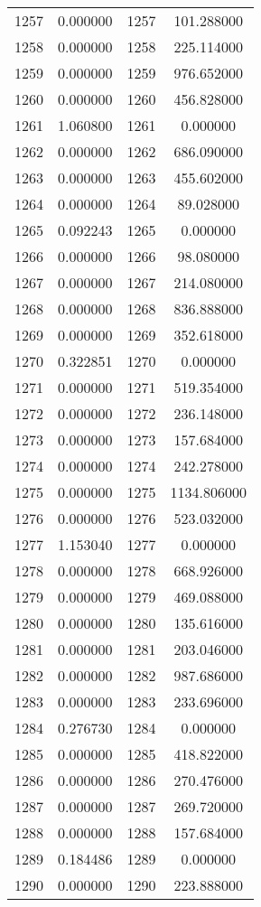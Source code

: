 \documentclass[12pt]{article}
\begin{document}
\begin{longtable}{@{}cccc@{}}
1257 & 0.000000 & 1257 & 101.288000 \\
1258 & 0.000000 & 1258 & 225.114000 \\
1259 & 0.000000 & 1259 & 976.652000 \\
1260 & 0.000000 & 1260 & 456.828000 \\
1261 & 1.060800 & 1261 & 0.000000 \\
1262 & 0.000000 & 1262 & 686.090000 \\
1263 & 0.000000 & 1263 & 455.602000 \\
1264 & 0.000000 & 1264 & 89.028000 \\
1265 & 0.092243 & 1265 & 0.000000 \\
1266 & 0.000000 & 1266 & 98.080000 \\
1267 & 0.000000 & 1267 & 214.080000 \\
1268 & 0.000000 & 1268 & 836.888000 \\
1269 & 0.000000 & 1269 & 352.618000 \\
1270 & 0.322851 & 1270 & 0.000000 \\
1271 & 0.000000 & 1271 & 519.354000 \\
1272 & 0.000000 & 1272 & 236.148000 \\
1273 & 0.000000 & 1273 & 157.684000 \\
1274 & 0.000000 & 1274 & 242.278000 \\
1275 & 0.000000 & 1275 & 1134.806000 \\
1276 & 0.000000 & 1276 & 523.032000 \\
1277 & 1.153040 & 1277 & 0.000000 \\
1278 & 0.000000 & 1278 & 668.926000 \\
1279 & 0.000000 & 1279 & 469.088000 \\
1280 & 0.000000 & 1280 & 135.616000 \\
1281 & 0.000000 & 1281 & 203.046000 \\
1282 & 0.000000 & 1282 & 987.686000 \\
1283 & 0.000000 & 1283 & 233.696000 \\
1284 & 0.276730 & 1284 & 0.000000 \\
1285 & 0.000000 & 1285 & 418.822000 \\
1286 & 0.000000 & 1286 & 270.476000 \\
1287 & 0.000000 & 1287 & 269.720000 \\
1288 & 0.000000 & 1288 & 157.684000 \\
1289 & 0.184486 & 1289 & 0.000000 \\
1290 & 0.000000 & 1290 & 223.888000 \\

\end{longtable}
\end{document}

